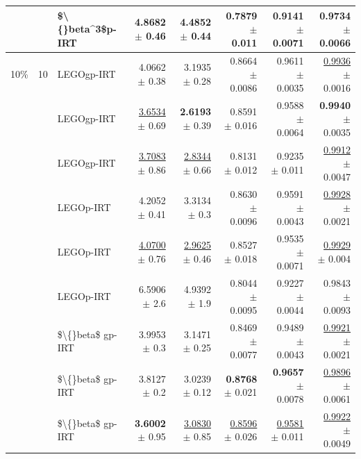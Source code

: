 \begin{longtable}{llp{}rrrrr}
 &  & \$\textbackslash\{\}beta\textasciicircum{}3\$p-IRT & 4.8682 {\scriptsize $\pm$ 0.46} & 4.4852 {\scriptsize $\pm$ 0.44} & 0.7879 {\scriptsize $\pm$ 0.011} & 0.9141 {\scriptsize $\pm$ 0.0071} & 0.9734 {\scriptsize $\pm$ 0.0066} \\
\midrule
10\% & 10 & LEGOgp-IRT & 4.0662 {\scriptsize $\pm$ 0.38} & 3.1935 {\scriptsize $\pm$ 0.28} & 0.8664 {\scriptsize $\pm$ 0.0086} & 0.9611 {\scriptsize $\pm$ 0.0035} & \underline{0.9936} {\scriptsize $\pm$ 0.0016} \\
 &  & LEGOgp-IRT & \underline{3.6534} {\scriptsize $\pm$ 0.69} & \textbf{2.6193} {\scriptsize $\pm$ 0.39} & 0.8591 {\scriptsize $\pm$ 0.016} & 0.9588 {\scriptsize $\pm$ 0.0064} & \textbf{0.9940} {\scriptsize $\pm$ 0.0035} \\
 &  & LEGOgp-IRT & \underline{3.7083} {\scriptsize $\pm$ 0.86} & \underline{2.8344} {\scriptsize $\pm$ 0.66} & 0.8131 {\scriptsize $\pm$ 0.012} & 0.9235 {\scriptsize $\pm$ 0.011} & \underline{0.9912} {\scriptsize $\pm$ 0.0047} \\
 &  & LEGOp-IRT & 4.2052 {\scriptsize $\pm$ 0.41} & 3.3134 {\scriptsize $\pm$ 0.3} & 0.8630 {\scriptsize $\pm$ 0.0096} & 0.9591 {\scriptsize $\pm$ 0.0043} & \underline{0.9928} {\scriptsize $\pm$ 0.0021} \\
 &  & LEGOp-IRT & \underline{4.0700} {\scriptsize $\pm$ 0.76} & \underline{2.9625} {\scriptsize $\pm$ 0.46} & 0.8527 {\scriptsize $\pm$ 0.018} & 0.9535 {\scriptsize $\pm$ 0.0071} & \underline{0.9929} {\scriptsize $\pm$ 0.004} \\
 &  & LEGOp-IRT & 6.5906 {\scriptsize $\pm$ 2.6} & 4.9392 {\scriptsize $\pm$ 1.9} & 0.8044 {\scriptsize $\pm$ 0.0095} & 0.9227 {\scriptsize $\pm$ 0.0044} & 0.9843 {\scriptsize $\pm$ 0.0093} \\
 &  & \$\textbackslash\{\}beta\$ gp-IRT & 3.9953 {\scriptsize $\pm$ 0.3} & 3.1471 {\scriptsize $\pm$ 0.25} & 0.8469 {\scriptsize $\pm$ 0.0077} & 0.9489 {\scriptsize $\pm$ 0.0043} & \underline{0.9921} {\scriptsize $\pm$ 0.0021} \\
 &  & \$\textbackslash\{\}beta\$ gp-IRT & 3.8127 {\scriptsize $\pm$ 0.2} & 3.0239 {\scriptsize $\pm$ 0.12} & \textbf{0.8768} {\scriptsize $\pm$ 0.021} & \textbf{0.9657} {\scriptsize $\pm$ 0.0078} & \underline{0.9896} {\scriptsize $\pm$ 0.0061} \\
 &  & \$\textbackslash\{\}beta\$ gp-IRT & \textbf{3.6002} {\scriptsize $\pm$ 0.95} & \underline{3.0830} {\scriptsize $\pm$ 0.85} & \underline{0.8596} {\scriptsize $\pm$ 0.026} & \underline{0.9581} {\scriptsize $\pm$ 0.011} & \underline{0.9922} {\scriptsize $\pm$ 0.0049} \\

\end{longtable}
